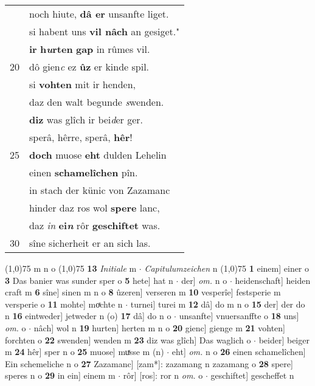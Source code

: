 \documentclass[8pt,a4paper,notitlepage]{article}
\begin{document}
\begin{table}[ht]
\begin{minipage}[t]{0.5\linewidth}
\begin{tabular}{rl}
 & noch hiute, \textbf{dâ er} unsanfte liget.\\ 
 & si habent uns \textbf{vil nâch} an gesiget."\\ 
 & \textbf{ir} \textbf{h\textit{u}rten} \textbf{gap} in rûmes vil.\\ 
20 & dô gien\textit{c} ez \textbf{ûz} er kinde spil.\\ 
 & si \textbf{vohten} mit ir henden,\\ 
 & daz den walt begunde \textit{s}wenden.\\ 
 & \textbf{diz} was glîch ir bei\textit{d}er ger.\\ 
 & sperâ, hêrre, sperâ, \textbf{hêr}!\\ 
25 & \textbf{doch} muose \textbf{eht} dulden Lehelin\\ 
 & einen \textbf{schamelîchen} pîn.\\ 
 & in stach der künic von Zazamanc\\ 
 & hinder daz ros wol \textbf{spere} lanc,\\ 
 & daz \textit{in} \textbf{ei\textit{n}} rôr \textbf{geschiftet} was.\\ 
30 & sîne sicherheit er an sich las.\\ 
\end{tabular}
\scriptsize
\line(1,0){75} \newline
m n o \newline
\line(1,0){75} \newline
\textbf{13} \textit{Initiale} m   $\cdot$ \textit{Capitulumzeichen} n  \newline
\line(1,0){75} \newline
\textbf{1} einem] einer o \textbf{3} Das banier was sunder sper o \textbf{5} hete] hat n  $\cdot$ der] \textit{om.} n o  $\cdot$ heidenschaft] heiden craft m \textbf{6} sîne] sinen m n o \textbf{8} ûzeren] verseren m \textbf{10} vesperîe] festsperie m versperie o \textbf{11} mohte] moͯchte n  $\cdot$ turnei] turei m \textbf{12} dâ] do m n o \textbf{15} der] der do n \textbf{16} eintweder] jetweder n (o) \textbf{17} dâ] do n o  $\cdot$ unsanfte] vnuersanffte o \textbf{18} uns] \textit{om.} o  $\cdot$ nâch] wol n \textbf{19} hurten] herten m n o \textbf{20} gienc] gienge m \textbf{21} vohten] forchten o \textbf{22} swenden] wenden m \textbf{23} diz was glîch] Das waglich o  $\cdot$ beider] beiger m \textbf{24} hêr] sper n o \textbf{25} muose] muͯsse m (n)  $\cdot$ eht] \textit{om.} n o \textbf{26} einen schamelîchen] Ein schemeliche n o \textbf{27} Zazamanc] [zam*]: zazamang n zazamang o \textbf{28} spere] speres n o \textbf{29} in ein] einem m  $\cdot$ rôr] [ros]: ror n \textit{om.} o  $\cdot$ geschiftet] gescheffet n \newline
\end{minipage}
\end{table}
\end{document}
